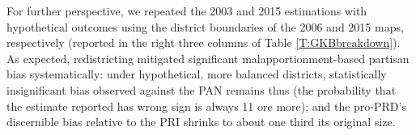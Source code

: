 \documentclass[letter,12pt]{article}
\let\footnote=\endnote
\begin{document}
{For further perspective, we repeated the 2003 and 2015 estimations with hypothetical outcomes using the district boundaries of the 2006 and 2015 maps, respectively (reported in the right three columns of Table \ref{T:GKBbreakdown}). As expected, redistricting mitigated significant malapportionment-based partisan bias systematically: under hypothetical, more balanced districts, statistically insignificant bias observed against the PAN remains thus (the probability that the estimate reported has wrong sign is always 11 ore more); and the pro-PRD's discernible bias relative to the PRI shrinks to about one third its original size.  


}
\end{document}
